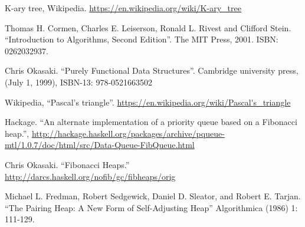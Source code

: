 \documentclass[b5paper]{article}
\begin{document}
\begin{thebibliography}{99}

K-ary tree, Wikipedia. \url{https://en.wikipedia.org/wiki/K-ary_tree}

Thomas H. Cormen, Charles E. Leiserson, Ronald L. Rivest and Clifford Stein. ``Introduction to Algorithms, Second Edition''. The MIT Press, 2001. ISBN: 0262032937.

Chris Okasaki. ``Purely Functional Data Structures''. Cambridge university press, (July 1, 1999), ISBN-13: 978-0521663502

Wikipedia, ``Pascal's triangle''. \url{https://en.wikipedia.org/wiki/Pascal's_triangle}

Hackage. ``An alternate implementation of a priority queue based on a Fibonacci heap.'', \url{http://hackage.haskell.org/packages/archive/pqueue-mtl/1.0.7/doc/html/src/Data-Queue-FibQueue.html}

Chris Okasaki. ``Fibonacci Heaps.'' \url{http://darcs.haskell.org/nofib/gc/fibheaps/orig}

Michael L. Fredman, Robert Sedgewick, Daniel D. Sleator, and Robert E. Tarjan. ``The Pairing Heap: A New Form of Self-Adjusting Heap'' Algorithmica (1986) 1: 111-129.

\end{thebibliography}

\expandafter\enddocument
\fi
\end{document}
